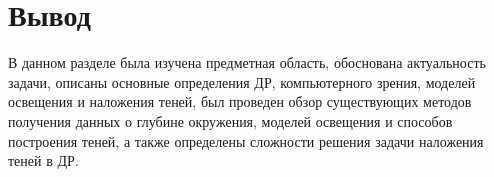 \section*{Вывод}

В данном разделе была изучена предметная область, обоснована актуальность задачи, описаны основные определения ДР, компьютерного зрения, моделей освещения и наложения теней, был проведен обзор существующих методов получения данных о глубине окружения, моделей освещения и способов построения теней, а также определены сложности решения задачи наложения теней в ДР.